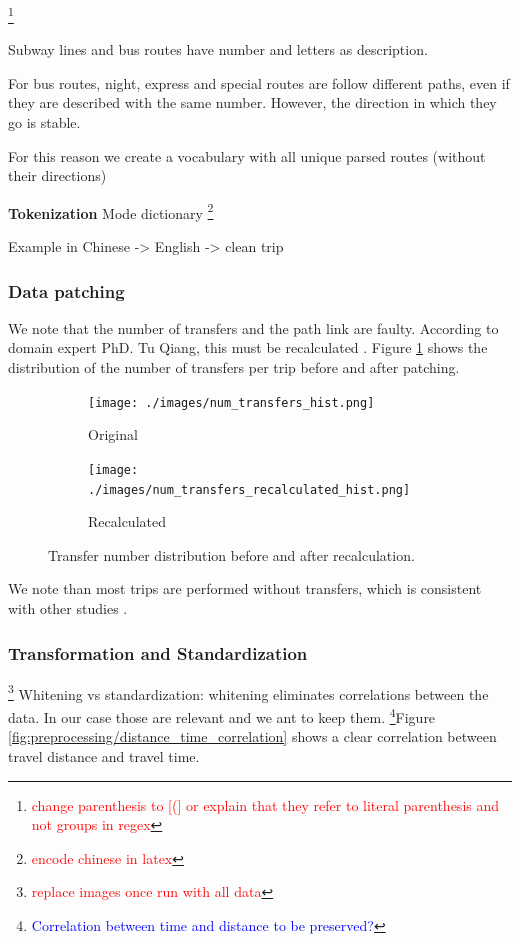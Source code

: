 \documentclass{article}
\newcommand{\selfnote}[1]{\footnote{\textcolor{red}{#1}}}
\newcommand{\technicalDoubt}[1]{\footnote{\textcolor{blue}{#1}}}
\begin{document}
\selfnote{change parenthesis to [(] or explain that they refer to literal parenthesis and not groups in regex}	
	
Subway lines and bus routes have number and letters as description. 

For bus routes, night, express and special routes are follow different paths, even if they are described with the same number. However, the direction in which they go is stable. 

For this reason we create a vocabulary with all unique parsed routes (without their directions)

\textbf{Tokenization}
Mode dictionary \selfnote{encode chinese in latex}



Example in Chinese -> English -> clean trip



\subsubsection{Data patching}
We note that the number of transfers and the path link are faulty. According to domain expert PhD. Tu Qiang, this must be recalculated \cite{tommy}. Figure \ref{fig:preprocessing/num_transfers} shows the distribution of the number of transfers per trip before and after patching.

\begin{figure}[H]
  \centering
  \begin{subfigure}[b]{.45\textwidth}
  	\centering
  	\texttt{[image: ./images/num\_transfers\_hist.png]}
  	\caption{Original}
  \end{subfigure}
  \begin{subfigure}[b]{.45\textwidth}
  	\centering
  	\texttt{[image: ./images/num\_transfers\_recalculated\_hist.png]}
  	\caption{Recalculated}
  \end{subfigure}
  \caption{Transfer number distribution before and after recalculation.}
  	\label{fig:preprocessing/num_transfers}
\end{figure}

We note than most trips are performed without transfers, which is consistent with other studies \cite{bhaskar2015passenger}.

\subsubsection{Transformation and Standardization} \selfnote{replace images once run with all data}
Whitening vs standardization: whitening eliminates correlations between the data. In our case those are relevant and we ant to keep them. \technicalDoubt{Correlation between time and distance to be preserved?}Figure \ref{fig:preprocessing/distance_time_correlation} shows a clear correlation between travel distance and travel time. 
\end{document}

